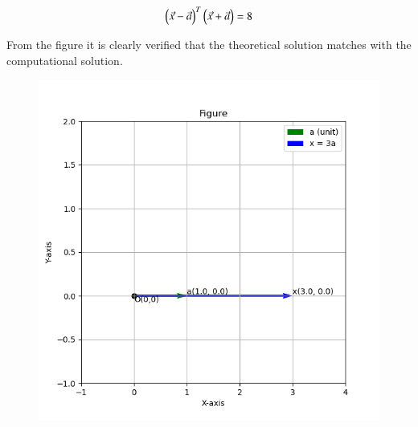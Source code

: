 \documentclass[journal]{IEEEtran}
\theoremstyle{remark}
\begin{document}
\begin{align}
    \begin{pmatrix}\Vec{x}-\Vec{a}\end{pmatrix}^T\begin{pmatrix}\Vec{x}+\Vec{a}\end{pmatrix}= 8
\end{align}


From the figure it is clearly verified that the theoretical solution matches with the computational solution.\\
\begin{figure}[h]
    \centering
    \includegraphics[height=0.5\textheight, keepaspectratio]{figs/figure1.png}
    \label{figure_1}
\end{figure}
\end{document}
